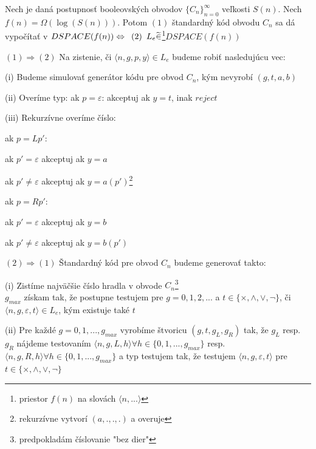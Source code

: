 \begin{lema}\label{Lema1}
Nech je daná postupnosť booleovských obvodov $\{C_n\}_{n=0}^{\infty}$ veľkosti $S(n)$.
Nech $f(n)=\Omega (\log(S(n)))$. Potom $(1)$ štandardný kód obvodu $C_n$ sa dá vypočítať
v $DSPACE(f(n)) \Leftrightarrow \enspace (2) \enspace L_e \widetilde{\in}$\footnote{priestor
$f(n)$ na slovách $\langle n,...\rangle$}$DSPACE(f(n))$
\end{lema}

\begin{dokaz}
\begin{description}
\item{$(1)\Rightarrow (2)$ }Na zistenie, či $\langle n,g,p,y \rangle \in L_e$ budeme robiť
nasledujúcu vec:
\begin{description}
\item{(i) }Budeme simulovať generátor kódu pre obvod $C_n$, kým nevyrobí $(g,t,a,b)$
\item{(ii) }Overíme typ: ak $p=\varepsilon$: akceptuj ak $y=t$, inak $reject$
\item{(iii) }Rekurzívne overíme číslo:
\begin{description}
\item ak $p=Lp'$:
\begin{description}
\item ak $p'=\varepsilon$ akceptuj ak $y=a$
\item ak $p'\neq \varepsilon$ akceptuj ak $y=a(p')$\footnote{rekurzívne vytvorí
$(a,.,.,.)$ a overuje}
\end{description}
\item ak $p=Rp'$:
\begin{description}
\item ak $p'=\varepsilon$ akceptuj ak $y=b$
\item ak $p'\neq \varepsilon$ akceptuj ak $y=b(p')$
\end{description}
\end{description}
\end{description}
\item{$(2)\Rightarrow (1)$ }Štandardný kód pre obvod $C_n$ budeme generovať takto:
\begin{description}
\item{(i) }Zistíme najväčšie číslo hradla v obvode $C_n$\footnote{predpokladám
číslovanie "bez dier"} \\ $g_{max}$ získam tak, že postupne testujem pre $g=0,1,2,...$ a
$t\in \{\times, \wedge, \vee, \neg\}$, či $\langle n,g,\varepsilon, t\rangle \in L_e$,
kým existuje také $t$
\item{(ii) }Pre každé $g=0,1,...,g_{max}$ vyrobíme štvoricu $(g,t,g_L,g_R)$ tak, že $g_L$
resp. $g_R$ nájdeme testovaním $\langle n,g,L,h \rangle \forall h \in
\{0,1,...,g_{max}\}$ resp. $\langle n,g,R,h \rangle \forall h \in \{0,1,...,g_{max}\}$ a
typ testujem tak, že testujem $\langle n,g,\varepsilon,t \rangle$ pre $t\in
\{\times,\wedge,\vee,\neg \}$
\end{description}
\end{description}
\end{dokaz}

